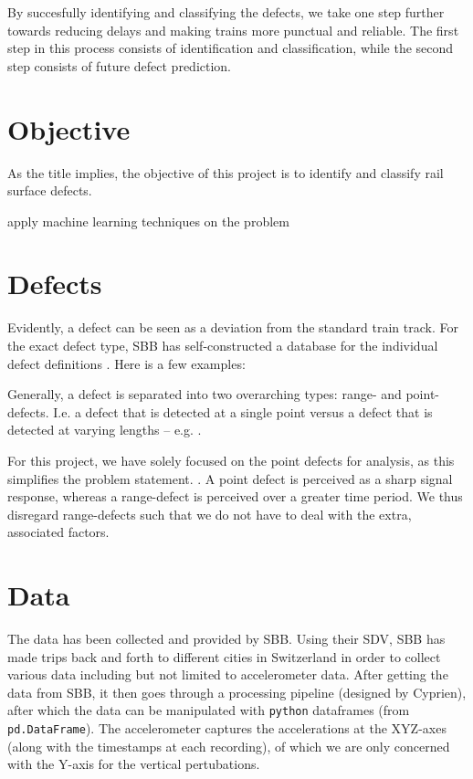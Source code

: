 By succesfully identifying and classifying the defects, we take one step further towards reducing delays and making trains more punctual and reliable. The first step in this process consists of identification and classification, while the second step consists of future defect prediction.

\section{Objective}
As the title implies, the objective of this project is to identify and classify rail surface defects. 

apply machine learning techniques on the problem

\section{Defects}
Evidently, a defect can be seen as a deviation from the standard train track. For the exact defect type, SBB has self-constructed a database for the individual defect definitions . Here is a few examples: 


Generally, a defect is separated into two overarching types: range- and point-defects. I.e. a defect that is detected at a single point versus a defect that is detected at varying lengths -- e.g. .

For this project, we have solely focused on the point defects for analysis, as this simplifies the problem statement. . A point defect is perceived as a sharp signal response, whereas a range-defect is perceived over a greater time period. We thus disregard range-defects such that we do not have to deal with the extra, associated factors. 



\section{Data}
The data has been collected and provided by SBB. Using their SDV, SBB has made trips back and forth to different cities in Switzerland in order to collect various data including but not limited to accelerometer data. After getting the data from SBB, it then goes through a processing pipeline (designed by Cyprien), after which the data can be manipulated with \verb|python| dataframes (from \verb|pd.DataFrame|). The accelerometer captures the accelerations at the XYZ-axes (along with the timestamps at each recording), of which we are only concerned with the Y-axis for the vertical pertubations.


